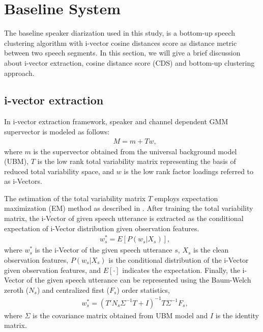 \documentclass[final,authoryear,5p,times,twocolumn]{elsarticle}
\begin{document}
\section{Baseline System}
The baseline speaker diarization used in this study, is a bottom-up speech clustering algorithm with i-vector cosine distances score as distance metric between two speech segments. In this section, we will give a brief discussion about i-vector extraction, cosine distance score (CDS) and bottom-up clustering approach. 

\subsection{i-vector extraction}
In i-vector extraction framework, speaker and channel dependent GMM supervector is modeled as follows:
\begin{equation}
\begin{aligned}
& M=m+Tw,
\label{mmtw}
\end{aligned}
\end{equation}
where $m$ is the supervector obtained from the universal background model (UBM), 
$T$ is the low rank total variability matrix representing the basis of reduced total variability space, 
and $w$ is the low rank factor loadings referred to as i-Vectors. 

The estimation of the total variability matrix $T$ employs expectation maximization (EM) method as described in \cite{kenny2005eigenvoice}. 
After training the total variability matrix, 
the i-Vector of given speech utterance is extracted as the conditional expectation of i-Vector distribution given observation features.
\begin{equation}
\begin{aligned}
&w_{s}^{\ast}=E[P(w_{s}|X_{s})],
\label{eq:ws}
\end{aligned}
\end{equation}
where $w_{s}^{\ast}$ is the i-Vector of the given speech utterance $s$, 
$X_{s}$ is the clean observation features, 
$P(w_{s}|X_{s})$ is the conditional distribution of the i-Vector given observation features, 
and $E[\cdot]$ indicates the expectation. 
Finally, the i-Vector of the given speech utterance can be represented using the Baum-Welch zeroth ($N_s$) and centralized first ($F_s$) order statistics,
\begin{equation}
\begin{aligned}
&w_{s}^{\ast}=(T'N_{s}\Sigma^{-1}T+I)^{-1}T\Sigma^{-1}F_{s},
\label{ws2}
\end{aligned}
\end{equation}
where $\Sigma$ is the covariance matrix obtained from UBM model and $I$ is the identity matrix.
\end{document}
